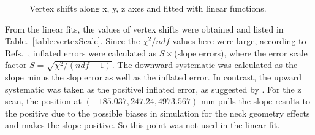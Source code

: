 \begin{figure}
	\centering
	\caption{Vertex shifts along x, y, z axes and fitted with linear functions.}
	\label{fig:vertexScale}
\end{figure}

From the linear fits, the values of vertex shifts were obtained and listed in Table.~\ref{table:vertexScale}. Since the $\chi^2/ndf$ values here were large, according to Refs.~\cite{waterunidoc,pdg2020}, inflated errors were calculated as $S\times$(slope errors), where the error scale factor $S=\sqrt{\chi^2/(ndf-1)}$. The downward systematic was calculated as the slope minus the slop error as well as the inflated error. In contrast, the upward systematic was taken as the positivel inflated error, as suggested by \cite{waterunidoc}. For the z scan, the position at $(-185.037,247.24,4973.567)$ mm pulls the slope results to the positive due to the possible biases in simulation for the neck geometry effects and makes the slope positive. So this point was not used in the linear fit.

